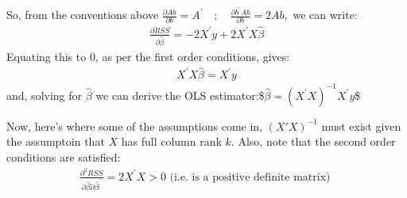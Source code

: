 \documentclass[letterpaper,10pt,english]{jupyterBook}
\begin{document}
So, from the conventions above \(
\frac{\partial A b}{\partial b}=A^{\prime} \quad ; \quad \frac{\partial b^{\prime} A b}{\partial b}=2 A b,
\) we can write:
\begin{equation*}
\begin{split}
\frac{\partial R S S}{\partial \hat{\beta}}=-2 X^{\prime} y+2 X^{\prime} X \hat{\beta}
\end{split}
\end{equation*}
Equating this to 0, as per the first order conditions, gives:
\begin{equation*}
\begin{split}
X^{\prime} X \hat{\beta}=X^{\prime} y
\end{split}
\end{equation*}
and, solving for \(\hat \beta\) we can derive the OLS estimator:\$\(
\hat{\beta}=\left(X^{\prime} X\right)^{-1} X^{\prime} y
\)\$

Now, here’s where some of the assumptions come in, \((X'X)^{-1}\) must exist given the assumptoin that \(X\) has full column rank \(k\).  Also, note that the second order conditions are satisfied:
\begin{equation*}
\begin{split}
\frac{\partial^{2} R S S}{\partial \hat{\beta} \partial \hat{\beta}^{\prime}}=2 X^{\prime} X>0 \text { (i.e. is a positive definite matrix) }
\end{split}
\end{equation*}






\renewcommand{\indexname}{Index}
\printindex
\end{document}
